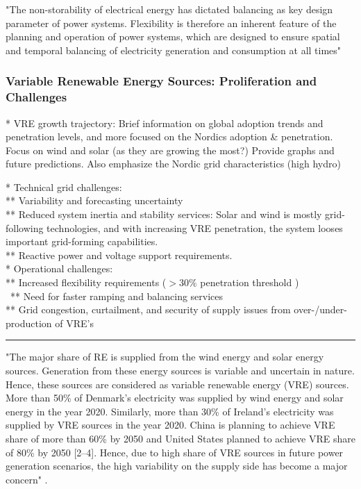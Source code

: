 "The non-storability of electrical energy has dictated balancing as key design parameter of power systems. Flexibility is therefore an inherent feature of the planning and operation of power systems, which are designed to ensure spatial and temporal balancing of electricity generation and consumption at all times" \cite{g_papaefthymiou_power_2018}



\subsubsection{Variable Renewable Energy Sources: Proliferation and Challenges}

* VRE growth trajectory: Brief information on global adoption trends and penetration levels, and more focused on the Nordics adoption \& penetration. Focus on wind and solar (as they are growing the most?) Provide graphs and future predictions. Also emphasize the Nordic grid characteristics (high hydro)

* Technical grid challenges: \\
** Variability and forecasting uncertainty \\
** Reduced system inertia and stability services: Solar and wind is mostly grid-following technologies, and with increasing VRE penetration, the system looses important grid-forming capabilities. \\
** Reactive power and voltage support requirements. \\

* Operational challenges: \\
** Increased flexibility requirements ($>30\%$ penetration threshold \cite{alireza_akrami_power_2019}) \\ \
** Need for faster ramping and balancing services \\
** Grid congestion, curtailment, and security of supply issues from over-/under-production of VRE's


\hrule

"The major share of RE is supplied from the wind energy and solar energy sources. Generation from these energy sources is variable and uncertain in nature. Hence, these sources are considered as variable renewable energy (VRE) sources. More than 50\% of Denmark’s electricity was supplied by wind energy and solar energy in the year 2020. Similarly, more than 30\% of Ireland’s electricity was supplied by VRE sources in the year 2020. China is planning to achieve VRE share of more than 60\% by 2050 and United States planned to achieve VRE share of 80\% by 2050 [2–4]. Hence, due to high share of VRE sources in future power generation scenarios, the high variability on the supply side has become a major concern" \cite{kaushik_comprehensive_2022}.



